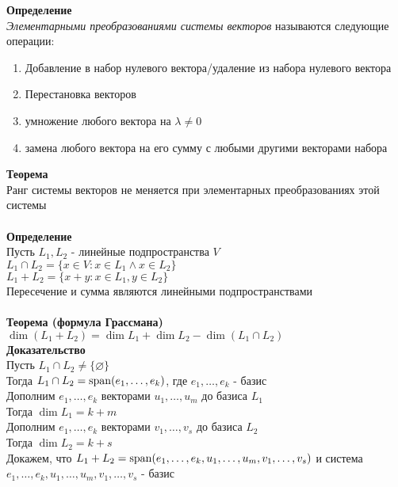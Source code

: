 \documentclass[12pt]{article}
\begin{document}
\textbf{Определение}\\
\textit{Элементарными преобразованиями системы векторов} называются следующие операции:
\begin{enumerate}
    \item Добавление в набор нулевого вектора/удаление из набора нулевого вектора
    \item Перестановка векторов
    \item умножение любого вектора на $\lambda \neq 0$
    \item замена любого вектора на его сумму с любыми другими векторами набора
\end{enumerate}
\textbf{Теорема}\\
Ранг системы векторов не меняется при элементарных преобразованиях этой системы\\\\
\textbf{Определение}\\
Пусть $L_1,L_2$ - линейные подпространства $V$\\
$L_1 \cap L_2 = \{x\in V: x\in L_1 \land x\in L_2 \}$\\
$L_1 + L_2 = \{ x+y: x\in L_1, y \in L_2\}$\\
Пересечение и сумма являются линейными подпространствами\\\\
\textbf{Теорема (формула Грассмана)}\\
$\dim(L_1+L_2) = \dim L_1 + \dim L_2 - \dim (L_1 \cap L_2)$\\
\textbf{Доказательство}\\
Пусть $L_1 \cap L_2 \neq \{\varnothing\}$\\
Тогда $L_1 \cap L_2 = \operatorname{span}(e_1, \ldots, e_k)$, где $e_1,\ldots,e_k$ - базис\\
Дополним $e_1,\ldots,e_k$ векторами $u_1,\ldots,u_m$ до базиса $L_1$\\
Тогда $\dim L_1 = k+m$\\
Дополним $e_1,\ldots,e_k$ векторами $v_1,\ldots,v_s$ до базиса $L_2$\\
Тогда $\dim L_2 = k+s$\\
Докажем, что $L_1 + L_2 = \operatorname{span}(e_1,\ldots,e_k,u_1,\ldots,u_m,v_1,\ldots,v_s)$ и система $e_1,\ldots,e_k,u_1,\ldots,u_m,v_1,\ldots,v_s$ - базис
\end{document}
